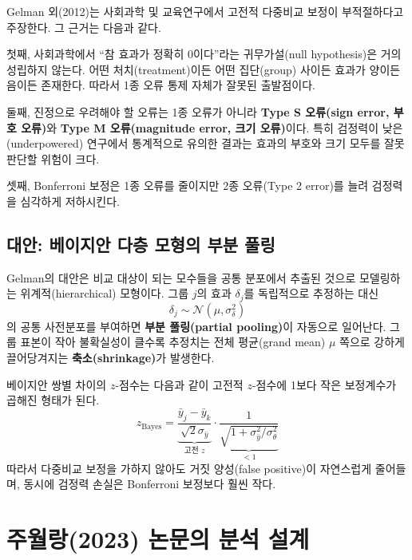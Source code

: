 \documentclass[11pt]{article}
\begin{document}
Gelman 외(2012)는 사회과학 및 교육연구에서 고전적 다중비교 보정이 부적절하다고 주장한다. 그 근거는 다음과 같다.

첫째, 사회과학에서 ``참 효과가 정확히 0이다''라는 귀무가설(null hypothesis)은 거의 성립하지 않는다. 어떤 처치(treatment)이든 어떤 집단(group) 사이든 효과가 양이든 음이든 존재한다. 따라서 1종 오류 통제 자체가 잘못된 출발점이다.

둘째, 진정으로 우려해야 할 오류는 1종 오류가 아니라 \textbf{Type S 오류(sign error, 부호 오류)}와 \textbf{Type M 오류(magnitude error, 크기 오류)}이다. 특히 검정력이 낮은(underpowered) 연구에서 통계적으로 유의한 결과는 효과의 부호와 크기 모두를 잘못 판단할 위험이 크다.

셋째, Bonferroni 보정은 1종 오류를 줄이지만 2종 오류(Type 2 error)를 늘려 검정력을 심각하게 저하시킨다.

\subsection{대안: 베이지안 다층 모형의 부분 풀링}

Gelman의 대안은 비교 대상이 되는 모수들을 공통 분포에서 추출된 것으로 모델링하는 위계적(hierarchical) 모형이다. 그룹 $j$의 효과 $\delta_j$를 독립적으로 추정하는 대신
\begin{equation}
\delta_j \sim \mathcal{N}(\mu, \sigma_\delta^2)
\label{eq:hier}
\end{equation}
의 공통 사전분포를 부여하면 \textbf{부분 풀링(partial pooling)}이 자동으로 일어난다. 그룹 표본이 작아 불확실성이 클수록 추정치는 전체 평균(grand mean) $\mu$ 쪽으로 강하게 끌어당겨지는 \textbf{축소(shrinkage)}가 발생한다.

베이지안 쌍별 차이의 $z$-점수는 다음과 같이 고전적 $z$-점수에 1보다 작은 보정계수가 곱해진 형태가 된다.
\begin{equation}
z_{\text{Bayes}} = \underbrace{\frac{\bar y_j - \bar y_k}{\sqrt{2}\sigma_{\bar y}}}_{\text{고전 } z} \cdot \underbrace{\frac{1}{\sqrt{1 + \sigma_{\bar y}^2/\sigma_\theta^2}}}_{< 1}
\label{eq:zbayes}
\end{equation}
따라서 다중비교 보정을 가하지 않아도 거짓 양성(false positive)이 자연스럽게 줄어들며, 동시에 검정력 손실은 Bonferroni 보정보다 훨씬 작다.

\section{주월랑(2023) 논문의 분석 설계}
\end{document}
